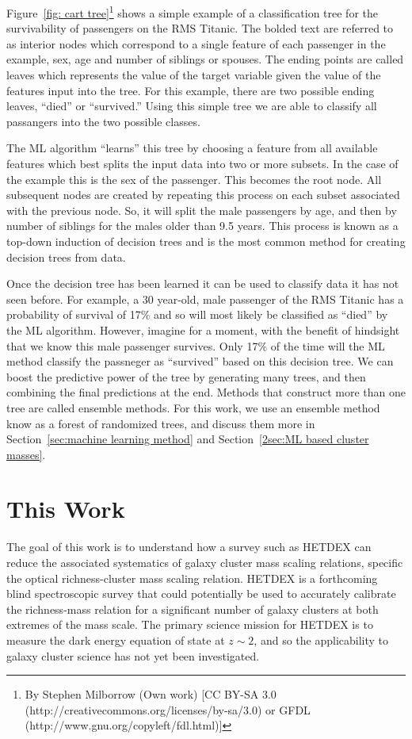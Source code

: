 Figure~\ref{fig: cart tree}\footnote{By Stephen Milborrow (Own work) [CC BY-SA 3.0 (http://creativecommons.org/licenses/by-sa/3.0) or GFDL (http://www.gnu.org/copyleft/fdl.html)]} shows a simple example of a classification tree for the survivability of passengers on the RMS Titanic. The bolded text are referred to as interior nodes which correspond to a single feature of each passenger in the example, sex, age and number of siblings or spouses. The ending points are called leaves which represents the value of the target variable given the value of the features input into the tree. For this example, there are two possible ending leaves, ``died'' or ``survived.'' Using this simple tree we are able to classify all passangers into the two possible classes. 

The ML algorithm ``learns'' this tree by choosing a feature from all available features which best splits the input data into two or more subsets. In the case of the example this is the sex of the passenger. This becomes the root node. All subsequent nodes are created by repeating this process on each subset associated with the previous node. So, it will split the male passengers by age, and then by number of siblings for the males older than 9.5 years. This process is known as a top-down induction of decision trees and is the most common method for creating decision trees from data.

Once the decision tree has been learned it can be used to classify data it has not seen before. For example, a 30 year-old, male passenger of the RMS Titanic has a probability of survival of 17\% and so will most likely be classified as ``died'' by the ML algorithm. However, imagine for a moment, with the benefit of hindsight that we know this male passenger survives. Only 17\% of the time will the ML method classify the passneger as ``survived'' based on this decision tree. We can boost the predictive power of the tree by generating many trees, and then combining the final predictions at the end. Methods that construct more than one tree are called ensemble methods. For this work, we use an ensemble method know as a forest of randomized trees, and discuss them more in Section~\ref{sec:machine learning method} and Section~\ref{2sec:ML based cluster masses}.

\section{This Work}
The goal of this work is to understand how a survey such as HETDEX can reduce the associated systematics of galaxy cluster mass scaling relations, specific the optical richness-cluster mass scaling relation. HETDEX is a forthcoming blind spectroscopic survey that could potentially be used to accurately calibrate the richness-mass relation for a significant number of galaxy clusters at both extremes of the mass scale. The primary science mission for HETDEX is to measure the dark energy equation of state at $z\sim2$, and so the applicability to galaxy cluster science has not yet been investigated.

